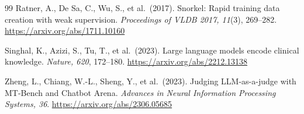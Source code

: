 \documentclass[11pt,a4paper]{article}
\begin{document}
\begin{thebibliography}{99}
Ratner, A., De Sa, C., Wu, S., et al.\ (2017).
Snorkel: Rapid training data creation with weak supervision.
\textit{Proceedings of VLDB 2017, 11}(3), 269--282.
\url{https://arxiv.org/abs/1711.10160}

Singhal, K., Azizi, S., Tu, T., et al.\ (2023).
Large language models encode clinical knowledge.
\textit{Nature, 620}, 172--180.
\url{https://arxiv.org/abs/2212.13138}

Zheng, L., Chiang, W.-L., Sheng, Y., et al.\ (2023).
Judging LLM-as-a-judge with MT-Bench and Chatbot Arena.
\textit{Advances in Neural Information Processing Systems, 36}.
\url{https://arxiv.org/abs/2306.05685}

\end{thebibliography}
\end{document}
